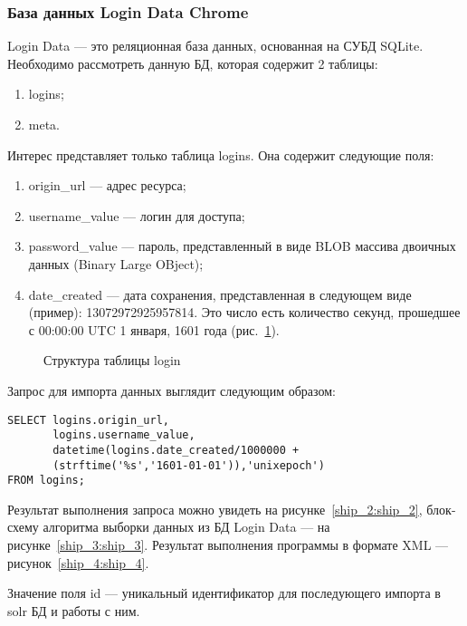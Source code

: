 \subsubsection{База данных Login Data Chrome}

Login Data --- это реляционная база данных, основанная на СУБД SQLite.
Необходимо рассмотреть данную БД, которая содержит 2 таблицы:

\begin{enumerate}
  \item logins;
  \item meta.
\end{enumerate}

Интерес представляет только таблица logins. Она содержит следующие поля:

\begin{enumerate}
  \item origin\_url --- адрес ресурса;
  \item username\_value --- логин для доступа;
  \item password\_value --- пароль, представленный в виде BLOB массива двоичных данных (Binary Large OBject);
  \item date\_created --- дата сохранения, представленная в следующем виде (пример): 13072972925957814. Это число есть количество секунд, прошедшее с 00:00:00 UTC 1 января, 1601 года (рис.~\ref{ship_1:ship_1}).
\end{enumerate}

\begin{figure}[h!]
\caption{Структура таблицы login}
\label{ship_1:ship_1}
\end{figure} 

Запрос для импорта данных выглядит следующим образом:

\begin{verbatim}
SELECT logins.origin_url,
       logins.username_value,
       datetime(logins.date_created/1000000 + 
       (strftime('%s','1601-01-01')),'unixepoch')
FROM logins;
\end{verbatim}

Результат выполнения запроса можно увидеть на рисунке~\ref{ship_2:ship_2}, блок-схему алгоритма выборки данных из БД Login Data --- на рисунке~\ref{ship_3:ship_3}. Результат выполнения программы в формате XML --- рисунок~\ref{ship_4:ship_4}.

Значение поля id --- уникальный идентификатор для последующего импорта в solr БД и работы с ним.

